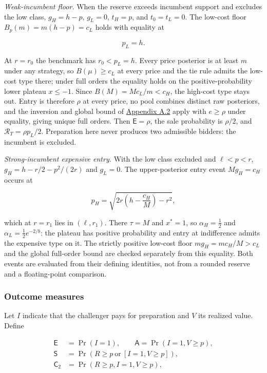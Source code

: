 \documentclass[
  12pt,
]{article}
\begin{document}
\emph{Weak-incumbent floor.} When the reserve exceeds incumbent support
and excludes the low class, \(g_H=h-p\), \(g_L=0\), \(t_H=p\), and
\(t_0=t_L=0\). The low-cost floor \(B_p(m)=m(h-p)=c_L\) holds with
equality at

\[
p_L=h.
\tag{A.50}\label{eq:paper-a-50}
\]

At \(r=r_0\) the benchmark has \(r_0<p_L=h\). Every price posterior is
at least \(m\) under any strategy, so \(B(\mu)\ge c_L\) at every price
and the tie rule admits the low-cost type there; under full orders the
equality holds on the positive-probability lower plateau \(x\le-1\).
Since \(B(M)=Mc_L/m<c_H\), the high-cost type stays out. Entry is
therefore \(\rho\) at every price, no pool combines distinct raw
posteriors, and the inversion and global bound of
\hyperref[pa-proofs]{Appendix A.2} apply with \(e\ge\rho\) under
equality, giving unique full orders. Then \(\mathsf E=\rho\), the sale
probability is \(\rho/2\), and \(\mathcal R_T=\rho p_L/2\). Preparation
here never produces two admissible bidders: the incumbent is excluded.

\emph{Strong-incumbent expensive entry.} With the low class excluded and
\(\ell<p<r\), \(g_H=h-r/2-p^2/(2r)\) and \(g_L=0\). The upper-posterior
entry event \(Mg_H=c_H\) occurs at

\[
p_H=\sqrt{2r\left(h-\frac{c_H}{M}\right)-r^2},
\tag{A.51}\label{eq:paper-a-51}
\]

which at \(r=r_1\) lies in \((\ell,r_1)\). There \(\tau=M\) and
\(x^*=1\), so \(\alpha_H=\tfrac12\) and \(\alpha_L=\tfrac12e^{-2/b}\):
the plateau has positive probability and entry at indifference admits
the expensive type on it. The strictly positive low-cost floor
\(mg_H=mc_H/M>c_L\) and the global full-order bound are checked
separately from this equality. Both events are evaluated from their
defining identities, not from a rounded reserve and a floating-point
comparison.

\subsubsection{Outcome measures}\label{outcome-measures}

Let \(I\) indicate that the challenger pays for preparation and \(V\)
its realized value. Define

\[
\begin{aligned}
\mathsf E&=\Pr(I=1),\qquad \mathsf A=\Pr(I=1,V\ge p),\\
\mathsf S&=\Pr(R\ge p\ \text{or}\ [I=1,V\ge p]),\\
\mathsf C_2&=\Pr(R\ge p,I=1,V\ge p),
\end{aligned}
\tag{A.52}\label{eq:paper-a-52}
\]
\end{document}
